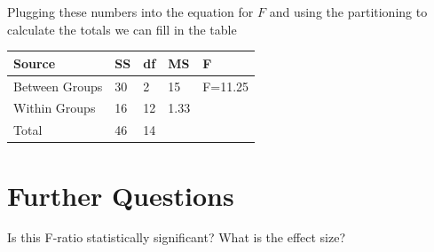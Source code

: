 \documentclass{tufte-handout}
\begin{document}
\begin{fullwidth}
Plugging these numbers into the equation for $F$ and using the partitioning to calculate the totals we can fill in the table

\begin{table}
  \centering
  \selectfont
  \begin{tabular}{lllll}
    \toprule
    Source & \qquad SS & \qquad df & \qquad MS & \qquad F \\
    \midrule
    Between Groups & 30 & 2 & 15 & F=11.25 \\
    Within Groups & 16& 12&1.33 & \\
    Total & 46& 14& & \\
    \bottomrule
  \end{tabular}
  \label{tab:normaltab}
\end{table}

\section{Further Questions}
Is this F-ratio statistically significant? What is the effect size?

\end{fullwidth}
\end{document}
